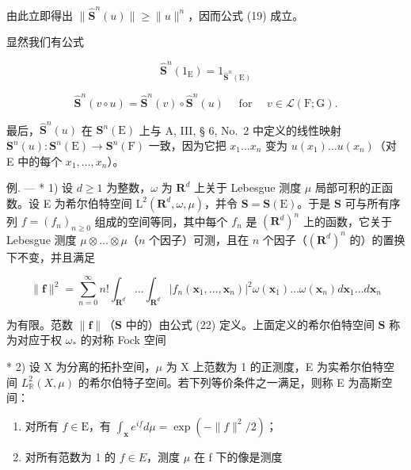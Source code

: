 由此立即得出 \(\| \hat{\mathbf{S}}^n (u)\| \geqslant \| u\| ^n\)，因而公式 (19) 成立。

显然我们有公式

\[
\hat {\mathbf {S}} ^ {n} (1 _ {\mathrm{E}}) = 1 _ {\hat {\mathbf {S}} ^ {n} (\mathrm{E})}\tag{20}
\]

\[
\hat {\mathbf {S}} ^ {n} (v \circ u) = \hat {\mathbf {S}} ^ {n} (v) \circ \hat {\mathbf {S}} ^ {n} (u) \quad \text { for } \quad v \in \mathscr {L} (\mathrm{F}; \mathrm{G}).\tag{21}
\]

最后，\(\hat{\mathbf{S}}^n (u)\) 在 \(\mathbf{S}^n (\mathrm{E})\) 上与 A, III, § 6, No.~2 中定义的线性映射 \(\mathbf{S}^n (u):\mathbf{S}^n (\mathrm{E})\to \mathbf{S}^n (\mathrm{F})\) 一致，因为它把 \(x_{1}\ldots x_{n}\) 变为 \(u(x_{1})\ldots u(x_{n})\)（对 E 中的每个 \(x_{1},\ldots ,x_{n}\)）。

例. --- * 1) 设 \(d \geqslant 1\) 为整数，\(\omega\) 为 \(\mathbf{R}^{d}\) 上关于 Lebesgue 测度 \(\mu\) 局部可积的正函数。设 E 为希尔伯特空间 \(\mathrm{L}^{2}(\mathbf{R}^{d}, \omega, \mu)\)，并令 \(\mathbf{S} = \mathbf{S}(\mathrm{E})\)。于是 \(\mathbf{S}\) 可与所有序列 \(f = (f_{n})_{n \geqslant 0}\) 组成的空间等同，其中每个 \(f_{n}\) 是 \((\mathbf{R}^{d})^{n}\) 上的函数，它关于 Lebesgue 测度 \(\mu \otimes \ldots \otimes \mu\)（\(n\) 个因子）可测，且在 \(n\) 个因子（\((\mathbf{R}^{d})^{n}\) 的）的置换下不变，并且满足

\[
\| \mathbf {f} \| ^ {2} = \sum_ {n = 0} ^ {\infty} n! \int_ {\mathbf {R} ^ {d}} \dots \int_ {\mathbf {R} ^ {d}} \left| f _ {n} (\mathbf {x} _ {1}, \dots , \mathbf {x} _ {n}) \right| ^ {2} \omega (\mathbf {x} _ {1}) \dots \omega (\mathbf {x} _ {n}) d \mathbf {x} _ {1} \dots d \mathbf {x} _ {n}\tag{22}
\]

为有限。范数 \(\| \mathbf{f}\|\)（\(\mathbf{S}\) 中的）由公式 (22) 定义。上面定义的希尔伯特空间 \(\mathbf{S}\) 称为对应于权 \(\omega_{*}\) 的对称 Fock 空间

* 2) 设 X 为分离的拓扑空间，\(\mu\) 为 X 上范数为 1 的正测度，E 为实希尔伯特空间 \(L_{\mathbb{R}}^{2}(X,\mu)\) 的希尔伯特子空间。若下列等价条件之一满足，则称 E 为高斯空间：

\begin{enumerate}
\def\labelenumi{\alph{enumi})}
\item
  对所有 \(f \in \mathrm{E}\)，有 \(\int_{\mathbf{x}} e^{if} d\mu = \exp(-\|f\|^2/2)\)；
\item
  对所有范数为 1 的 \(f \in E\)，测度 \(\mu\) 在 f 下的像是测度
\end{enumerate}

